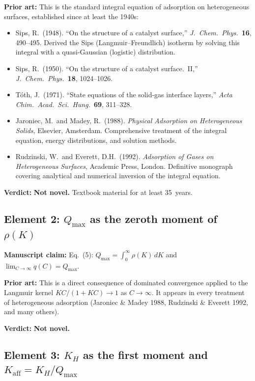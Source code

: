 \documentclass[12pt]{article}
\begin{document}
\textbf{Prior art:} This is the standard integral equation of adsorption
on heterogeneous surfaces, established since at least the 1940s:
\begin{itemize}[nosep]
  \item Sips, R.\ (1948). ``On the structure of a catalyst surface,''
        \textit{J.\ Chem.\ Phys.}\ \textbf{16}, 490--495.  Derived the
        Sips (Langmuir--Freundlich) isotherm by solving this integral
        with a quasi-Gaussian (logistic) distribution.
  \item Sips, R.\ (1950). ``On the structure of a catalyst surface.\ II,''
        \textit{J.\ Chem.\ Phys.}\ \textbf{18}, 1024--1026.
  \item T\'oth, J.\ (1971). ``State equations of the solid-gas interface
        layers,'' \textit{Acta Chim.\ Acad.\ Sci.\ Hung.}\ \textbf{69},
        311--328.
  \item Jaroniec, M.\ and Madey, R.\ (1988). \textit{Physical Adsorption
        on Heterogeneous Solids}, Elsevier, Amsterdam.  Comprehensive
        treatment of the integral equation, energy distributions, and
        solution methods.
  \item Rudzinski, W.\ and Everett, D.H.\ (1992). \textit{Adsorption of
        Gases on Heterogeneous Surfaces}, Academic Press, London.
        Definitive monograph covering analytical and numerical inversion
        of the integral equation.
\end{itemize}

\textbf{Verdict:} \textbf{Not novel.}  Textbook material for at least
35~years.

\subsection{Element 2: $Q_{\max}$ as the zeroth moment of $\rho(K)$}

\textbf{Manuscript claim:} Eq.~(5): $Q_{\max}=\int_0^\infty\rho(K)\,dK$
and $\lim_{C\to\infty}q(C)=Q_{\max}$.

\textbf{Prior art:} This is a direct consequence of dominated convergence
applied to the Langmuir kernel $KC/(1+KC)\to 1$ as $C\to\infty$.  It
appears in every treatment of heterogeneous adsorption (Jaroniec \&
Madey 1988, Rudzinski \& Everett 1992, and many others).

\textbf{Verdict:} \textbf{Not novel.}

\subsection{Element 3: $K_H$ as the first moment and $K_{\mathrm{aff}}=K_H/Q_{\max}$}
\end{document}

